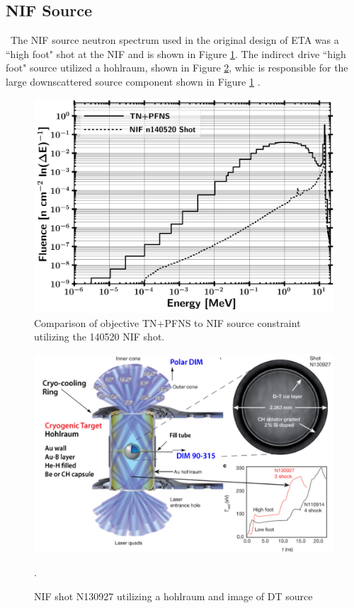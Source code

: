\subsection{NIF Source}

\ The NIF source neutron spectrum used in the original design of ETA was a ``high foot" shot at the NIF and is shown in Figure \ref{fig:NIFSRC3}.
The indirect drive ``high foot" source utilized a hohlraum, shown in Figure \ref{fig:NIFSRC4}, whic is responsible for the large downscattered source component shown in Figure \ref{fig:NIFSRC3} \cite{NIF1}.  

\begin{figure}[htb!]
	\centering
	\includegraphics[width=13cm]{Figures/Chapter3/SRC_Obj_leth.png}
	\caption{Comparison of objective TN+PFNS to NIF source constraint utilizing the 140520 NIF shot.}
	\label{fig:NIFSRC3}
\end{figure}

\begin{figure}[htb!]
	\includegraphics[width=\linewidth]{Figures/Chapter3/Hohlraum.png}
	\caption[NIF shot N130927 utilizing a hohlraum and image of DT source.]{NIF shot N130927 utilizing a hohlraum and image of DT source \cite{NIF1}}. 
	\label{fig:NIFSRC4}
\end{figure}

